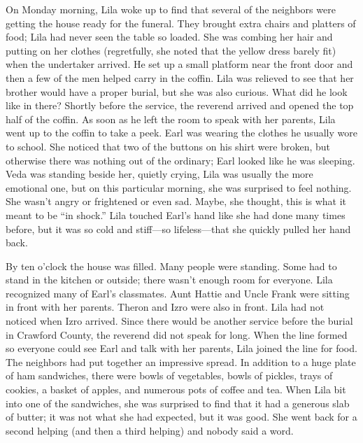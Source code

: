 \documentclass[
  letterpaper,
]{book}
\begin{document}
On Monday morning, Lila woke up to find that several of the neighbors
were getting the house ready for the funeral. They brought extra chairs
and platters of food; Lila had never seen the table so loaded. She was
combing her hair and putting on her clothes (regretfully, she noted that
the yellow dress barely fit) when the undertaker arrived. He set up a
small platform near the front door and then a few of the men helped
carry in the coffin. Lila was relieved to see that her brother would
have a proper burial, but she was also curious. What did he look like in
there? Shortly before the service, the reverend arrived and opened the
top half of the coffin. As soon as he left the room to speak with her
parents, Lila went up to the coffin to take a peek. Earl was wearing the
clothes he usually wore to school. She noticed that two of the buttons
on his shirt were broken, but otherwise there was nothing out of the
ordinary; Earl looked like he was sleeping. Veda was standing beside
her, quietly crying, Lila was usually the more emotional one, but on
this particular morning, she was surprised to feel nothing. She wasn't
angry or frightened or even sad. Maybe, she thought, this is what it
meant to be ``in shock.'' Lila touched Earl's hand like she had done
many times before, but it was so cold and stiff---so lifeless---that she
quickly pulled her hand back.

By ten o'clock the house was filled. Many people were standing. Some had
to stand in the kitchen or outside; there wasn't enough room for
everyone. Lila recognized many of Earl's classmates. Aunt Hattie and
Uncle Frank were sitting in front with her parents. Theron and Izro were
also in front. Lila had not noticed when Izro arrived. Since there would
be another service before the burial in Crawford County, the reverend
did not speak for long. When the line formed so everyone could see Earl
and talk with her parents, Lila joined the line for food. The neighbors
had put together an impressive spread. In addition to a huge plate of
ham sandwiches, there were bowls of vegetables, bowls of pickles, trays
of cookies, a basket of apples, and numerous pots of coffee and tea.
When Lila bit into one of the sandwiches, she was surprised to find that
it had a generous slab of butter; it was not what she had expected, but
it was good. She went back for a second helping (and then a third
helping) and nobody said a word.
\end{document}
